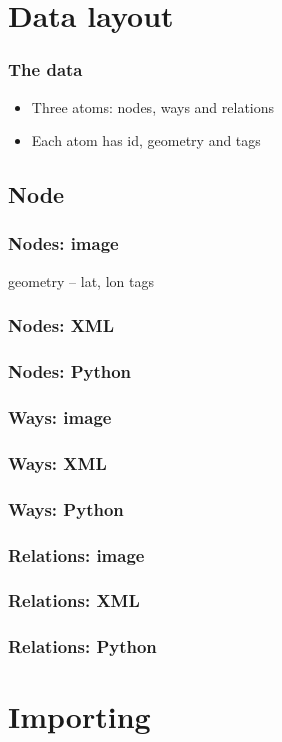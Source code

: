 \documentclass{beamer}
\begin{document}
\section{Data layout}
\label{sec:diving}

\begin{frame}
  \frametitle{The data}
  \begin{itemize}
  \item Three atoms: nodes, ways and relations
  \item Each atom has id, geometry and tags
  \end{itemize}
\end{frame}

\subsection{Node}
\label{sec:node}

\begin{frame}
  \frametitle{Nodes: image}
  geometry -- lat, lon
  tags
\end{frame}

\begin{frame}
  \frametitle{Nodes: XML}
\end{frame}

\begin{frame}
  \frametitle{Nodes: Python}
\end{frame}


\begin{frame}
  \frametitle{Ways: image}
\end{frame}

\begin{frame}
  \frametitle{Ways: XML}
\end{frame}

\begin{frame}
  \frametitle{Ways: Python}
\end{frame}

\begin{frame}
  \frametitle{Relations: image}
\end{frame}

\begin{frame}
  \frametitle{Relations: XML}
\end{frame}

\begin{frame}
  \frametitle{Relations: Python}
\end{frame}

\section{Importing}
\label{sec:importing}
\end{document}
